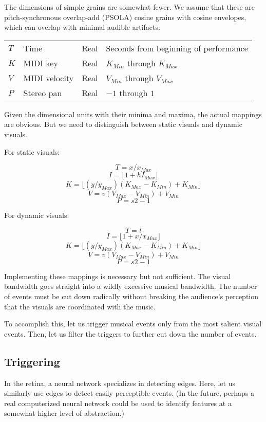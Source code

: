 \documentclass[english,11pt,letterpaper,onecolumn]{scrartcl}
\newcommand\floor[1]{\lfloor#1\rfloor}
\begin{document}
\noindent The dimensions of simple grains are somewhat fewer. We assume that 
these are pitch-synchronous overlap-add (PSOLA) cosine grains with cosine 
envelopes, which can overlap with minimal audible artifacts:

\begin{center}
\begin{tabular}{llll}
$T$ & Time & Real & Seconds from beginning of performance\\
$K$ & MIDI key & Real & $K_{Min}$ through $K_{Max}$\\
$V$ & MIDI velocity & Real & $V_{Min}$ through $V_{Max}$\\
$P$ & Stereo pan & Real & $-1$ through $1$\\
\end{tabular}
\end{center}

Given the dimensional units with their minima and maxima, the actual mappings 
are obvious. But we need to distinguish between static visuals and dynamic 
visuals.

For static visuals:

$$T = x / x_{Max} $$
$$I = \floor{1 + h I_{Max} }$$
$$K = \floor{(y / y_{Max}) (K_{Max} - K_{Min}) + K_{Min}} $$
$$V = v (V_{Max} - V_{Min}) + V_{Min}$$
$$P = s 2 - 1 $$

For dynamic visuals:

$$T = t $$
$$I = \floor{1 + x / x_{Max} }$$
$$K = \floor{(y / y_{Max}) (K_{Max} - K_{Min}) + K_{Min}} $$
$$V = v (V_{Max} - V_{Min}) + V_{Min}$$
$$P = s 2 - 1 $$

Implementing these mappings is necessary but not sufficient. The visual 
bandwidth goes straight into a wildly excessive musical bandwidth. The number 
of events must be cut down radically without breaking the audience's 
perception that the visuals are coordinated with the music. 

To accomplish this, let us trigger musical events only from the most salient 
visual events. Then, let us filter the triggers to further cut down the number 
of events.

\subsection{Triggering}

In the retina, a neural network specializes in detecting edges. Here, let us 
similarly use edges to detect easily perceptible events. (In the future, 
perhaps a real computerized neural network could be used to identify features 
at a somewhat higher level of abstraction.)
\end{document}
